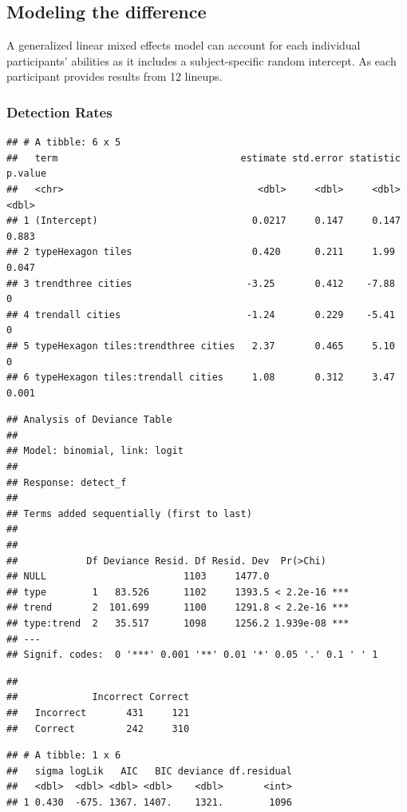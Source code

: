 \documentclass[conference,final,]{IEEEtran}
\begin{document}
\hypertarget{modeling-the-difference}{%
\subsection{Modeling the difference}\label{modeling-the-difference}}

A generalized linear mixed effects model can account for each individual
participants' abilities as it includes a subject-specific random
intercept. As each participant provides results from 12 lineups.

\hypertarget{detection-rates}{%
\subsubsection{Detection Rates}\label{detection-rates}}

\begin{verbatim}
## # A tibble: 6 x 5
##   term                                estimate std.error statistic p.value
##   <chr>                                  <dbl>     <dbl>     <dbl>   <dbl>
## 1 (Intercept)                           0.0217     0.147     0.147   0.883
## 2 typeHexagon tiles                     0.420      0.211     1.99    0.047
## 3 trendthree cities                    -3.25       0.412    -7.88    0    
## 4 trendall cities                      -1.24       0.229    -5.41    0    
## 5 typeHexagon tiles:trendthree cities   2.37       0.465     5.10    0    
## 6 typeHexagon tiles:trendall cities     1.08       0.312     3.47    0.001
\end{verbatim}

\begin{verbatim}
## Analysis of Deviance Table
## 
## Model: binomial, link: logit
## 
## Response: detect_f
## 
## Terms added sequentially (first to last)
## 
## 
##            Df Deviance Resid. Df Resid. Dev  Pr(>Chi)    
## NULL                        1103     1477.0              
## type        1   83.526      1102     1393.5 < 2.2e-16 ***
## trend       2  101.699      1100     1291.8 < 2.2e-16 ***
## type:trend  2   35.517      1098     1256.2 1.939e-08 ***
## ---
## Signif. codes:  0 '***' 0.001 '**' 0.01 '*' 0.05 '.' 0.1 ' ' 1
\end{verbatim}

\begin{verbatim}
##            
##             Incorrect Correct
##   Incorrect       431     121
##   Correct         242     310
\end{verbatim}

\begin{verbatim}
## # A tibble: 1 x 6
##   sigma logLik   AIC   BIC deviance df.residual
##   <dbl>  <dbl> <dbl> <dbl>    <dbl>       <int>
## 1 0.430  -675. 1367. 1407.    1321.        1096
\end{verbatim}
\end{document}
